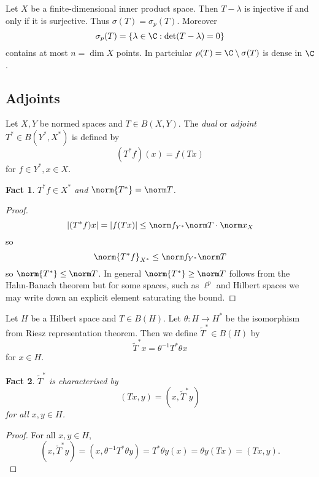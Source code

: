 \documentclass[a4paper]{article}
\newtheorem*{fact}{Fact}
\begin{document}
\begin{eg}
  Let \(X\) be a finite-dimensional inner product space. Then \(T - \lambda\) is injective if and only if it is surjective. Thus \(\sigma(T) = \sigma_p(T)\). Moreover
  \[
    \sigma_p(T) = \{\lambda \in \C: \det(T - \lambda) = 0\}
  \]
  contains at most \(n = \dim X\) points. In partciular \(\rho(T) = \C \setminus \sigma(T)\) is dense in \(\C\).
\end{eg}

\subsection{Adjoints}

\begin{definition}
  Let \(X, Y\) be normed spaces and \(T \in B(X, Y)\). The \emph{dual} or \emph{adjoint} \(T^* \in B(Y^*, X^*)\) is defined by
  \[
    (T^*f)(x) = f(Tx)
  \]
  for \(f \in Y^*, x \in X\).
\end{definition}

\begin{fact}
  \(T^*f \in X^*\) and \(\norm{T^*} = \norm T\).
\end{fact}

\begin{proof}
  \[
    |(T^*f)x| = |f(Tx)| \leq \norm f_{Y^*} \norm T \cdot \norm x_X
  \]
  so
  \[
    \norm{T^*f}_{X^*} \leq \norm f_{Y^*} \norm T
  \]
  so \(\norm{T^*} \leq \norm T\). In general \(\norm{T^*} \geq \norm T\) follows from the Hahn-Banach theorem but for some spaces, such as \(\ell^p\) and Hilbert spaces we may write down an explicit element saturating the bound.
\end{proof}

\begin{definition}
  Let \(H\) be a Hilbert space and \(T \in B(H)\). Let \(\theta: H \to H^*\) be the isomorphism from Riesz representation theorem. Then we define \(\tilde T^* \in B(H)\) by
  \[
    \tilde T^* x = \theta^{-1}T^* \theta x
  \]
  for \(x \in H\).
\end{definition}

\begin{fact}
  \(\tilde T^*\) is characterised by
  \[
    (Tx, y) = (x, \tilde T^* y)
  \]
  for all \(x, y \in H\).
\end{fact}

\begin{proof}
  For all \(x, y \in H\),
  \[
    (x, \tilde T^*y)
    = (x, \theta^{-1} T^* \theta y)
    = T^*\theta y(x)
    = \theta y(Tx)
    = (Tx, y).
  \]
\end{proof}
\end{document}
